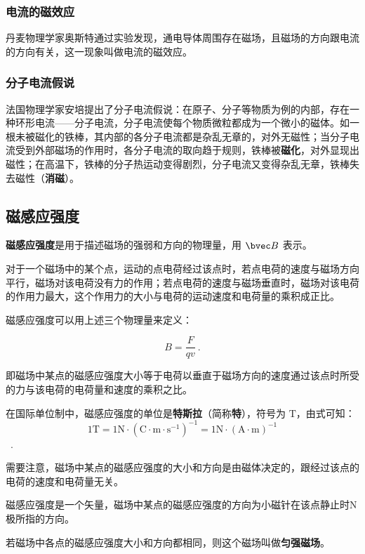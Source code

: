 \subsubsection{电流的磁效应}

丹麦物理学家奥斯特通过实验发现，通电导体周围存在磁场，且磁场的方向跟电流的方向有关，这一现象叫做电流的磁效应。

\subsubsection{分子电流假说}

法国物理学家安培提出了分子电流假说：在原子、分子等物质为例的内部，存在一种环形电流——分子电流，分子电流使每个物质微粒都成为一个微小的磁体。如一根未被磁化的铁棒，其内部的各分子电流都是杂乱无章的，对外无磁性；当分子电流受到外部磁场的作用时，各分子电流的取向趋于规则，铁棒被\textbf{磁化}，对外显现出磁性；在高温下，铁棒的分子热运动变得剧烈，分子电流又变得杂乱无章，铁棒失去磁性（\textbf{消磁}）。

\subsection{磁感应强度}

\textbf{磁感应强度}是用于描述磁场的强弱和方向的物理量，用 $\bvec B$ 表示。

对于一个磁场中的某个点，运动的点电荷经过该点时，若点电荷的速度与磁场方向平行，磁场对该电荷没有力的作用；若点电荷的速度与磁场垂直时，磁场对该电荷的作用力最大，这个作用力的大小与电荷的运动速度和电荷量的乘积成正比。

磁感应强度可以用上述三个物理量来定义：

\begin{equation}
B=\frac{F}{qv}~.
\end{equation}

即磁场中某点的磁感应强度大小等于电荷以垂直于磁场方向的速度通过该点时所受的力与该电荷的电荷量和速度的乘积之比。

在国际单位制中，磁感应强度的单位是\textbf{特斯拉}（简称\textbf{特}），符号为 $\mathrm{T}$，由式可知：
$$1\mathrm{T}=1\mathrm{N}\cdot ( \mathrm{C \cdot m \cdot s^{-1} } )^{-1}= 1 \mathrm{N} \cdot ( \mathrm{A} \cdot \mathrm{m})^{-1}$$~.

需要注意，磁场中某点的磁感应强度的大小和方向是由磁体决定的，跟经过该点的电荷的速度和电荷量无关。

磁感应强度是一个矢量，磁场中某点的磁感应强度的方向为小磁针在该点静止时$\mathrm{N}$极所指的方向。

若磁场中各点的磁感应强度大小和方向都相同，则这个磁场叫做\textbf{匀强磁场}。


